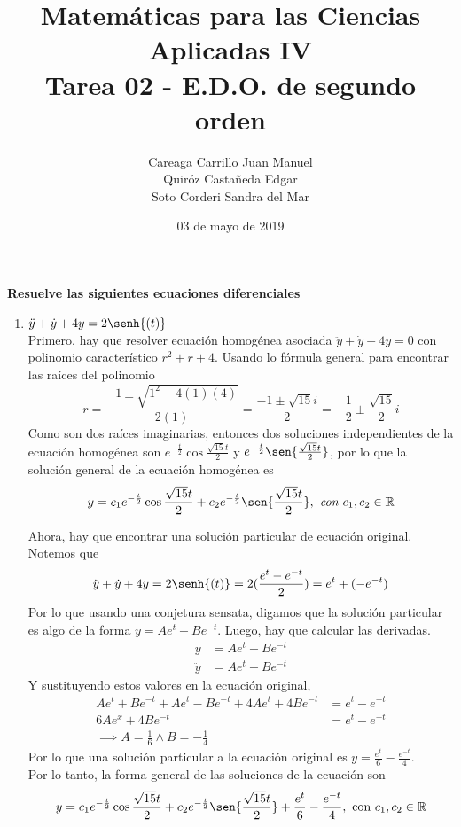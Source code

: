 \documentclass{article}
\title{
    Matemáticas para las Ciencias Aplicadas IV\\
    Tarea 02 - E.D.O. de segundo orden
}
\author{
    Careaga Carrillo Juan Manuel \\
    Quiróz Castañeda Edgar \\
    Soto Corderi Sandra del Mar
}
\date{
    03 de mayo de 2019
}
\begin{document}
    \maketitle
    {\bf Resuelve las siguientes ecuaciones diferenciales}
    \begin{enumerate}
        \item {
            $\ddot y+\dot y+4y=2\senh{(t)}$\\
            \color{azul}
            Primero, hay que resolver ecuación homogénea asociada
            $\ddot y+\dot y+4y=0$ con polinomio característico
            $r^2+r+4$.
            Usando lo fórmula general para encontrar las raíces del polinomio
            \[
            r = \frac{-1\pm\sqrt{1^2-4(1)(4)}}{2(1)} =
            \frac{-1\pm\sqrt{15}i}{2} =
            -\frac{1}{2}\pm\frac{\sqrt{15}}{2}i
            \]
            Como son dos raíces imaginarias, entonces dos soluciones
            independientes de la ecuación
            homogénea son $e^{-\frac{t}{2}}\cos{\frac{\sqrt{15}t}{2}}$ 
            y $e^{-\frac{t}{2}}\sen{\frac{\sqrt{15}t}{2}}$, por lo que 
            la solución general de la ecuación homogénea es
            \[y = c_1e^{-\frac{t}{2}}\cos{\frac{\sqrt{15}t}{2}} + 
            c_2e^{-\frac{t}{2}}\sen{\frac{\sqrt{15}t}{2}}, \textit{ con } c_1, c_2 \in \mathbb{R}\]
            
            Ahora, hay que encontrar una solución particular de ecuación
            original. Notemos que
            \[
            \ddot y+\dot y+4y=2\senh{(t)} = 
            2(\frac{e^t-e^{-t}}{2}) = 
            e^t+ (-e^{-t})
            \]
            Por lo que usando una conjetura sensata, digamos que la
            solución particular es algo de la forma $y=Ae^t+Be^{-t}$.
            Luego, hay que calcular las derivadas.
            \begin{align*}
                \dot y &= Ae^t-Be^{-t} \\
                \ddot y &= Ae^t+Be^{-t}
            \end{align*}
            Y sustituyendo estos valores en la ecuación original, 
            \begin{align*}
                 Ae^t+Be^{-t} + Ae^t-Be^{-t} + 4Ae^t+4Be^{-t} &= 
                 e^t-e^{-t}\\
                 6Ae^x+4Be^{-t} &=e^t-e^{-t} \\
                 \implies A = \frac{1}{6} \land B = -\frac{1}{4}
            \end{align*}
            Por lo que una solución particular a la ecuación original
            es $y = \frac{e^t}{6}-\frac{e^{-t}}{4}$. \\
            Por lo tanto, la forma general de las soluciones de la 
            ecuación son 
            \[y = c_1e^{-\frac{t}{2}}\cos{\frac{\sqrt{15}t}{2}} + 
            c_2e^{-\frac{t}{2}}\sen{\frac{\sqrt{15}t}{2}} +
            \frac{e^t}{6}-\frac{e^{-t}}{4}, \text{ con } 
            c_1, c_2 \in \mathbb{R}\]
            
}
\end{enumerate}
\end{document}

